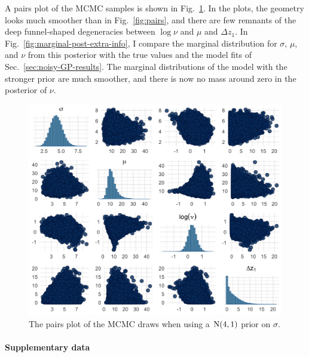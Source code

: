A pairs plot of the MCMC samples is shown in Fig.~\ref{fig:pairs-strong-prior}. In the plots, the geometry looks much smoother than in Fig.~\ref{fig:pairs}, and there are few remnants of the deep funnel-shaped degeneracies between $\log{\nu}$ and $\mu$ and $\Delta z_1$. In Fig.~\ref{fig:marginal-post-extra-info}, I compare the marginal distribution for $\sigma$, $\mu$, and $\nu$ from this posterior with the true values and the model fits of Sec.~\ref{sec:noisy-GP-results}. The marginal distributions of the model with the stronger prior are much smoother, and there is now no mass around zero in the posterior of $\nu$.

\begin{figure}[tbp]
  \centering
  \includegraphics[width=0.95\columnwidth]{./figures/ch-4/strong-prior-pairs.png}
  \caption{The pairs plot of the MCMC draws when using a $\hbox{N}(4, 1)$ prior on $\sigma$.}
  \label{fig:pairs-strong-prior}
\end{figure}

\paragraph*{Supplementary data}

